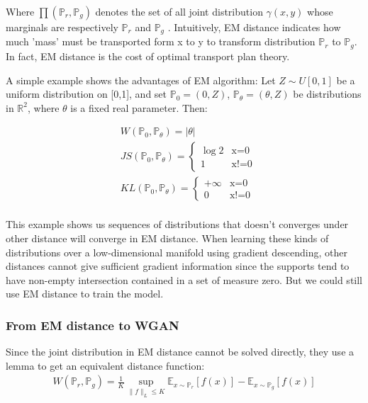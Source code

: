 Where $\prod(\mathbb{P}_r,\mathbb{P}_g)$ denotes the set of all joint distribution $\gamma(x,y)$ whose marginals are respectively $\mathbb{P}_r$ and $\mathbb{P}_g$ . Intuitively, EM distance indicates how much 'mass' must be transported form x to y to transform distribution $\mathbb{P}_r$ to $\mathbb{P}_g$. In fact, EM distance is the cost of optimal transport plan theory.

A simple example shows the advantages of EM algorithm: Let $Z \sim U[0,1]$ be a uniform distribution on [0,1], and set $\mathbb{P}_0 = (0,Z)$, $\mathbb{P}_\theta=(\theta,Z)$ be distributions in $\mathbb{R}^2$, where $\theta$ is a fixed real parameter. Then:

\begin{equation}
\begin{aligned}
&W(\mathbb{P}_0,\mathbb{P}_\theta) = |\theta|\\
&JS(\mathbb{P}_0,\mathbb{P}_\theta) = 
\begin{cases}
\log 2& \text{x=0}\\
1& \text{x!=0}
\end{cases}\\
&KL(\mathbb{P}_0,\mathbb{P}_\theta) = 
\begin{cases}
+\infty & \text{x=0}\\
0 & \text{x!=0}
\end{cases}\\
\end{aligned}
\end{equation}

This example shows us sequences of distributions that doesn't converges under other distance will converge in EM distance. When learning these kinds of distributions over a low-dimensional manifold using gradient descending, other distances cannot give sufficient gradient information since the supports tend to have non-empty intersection contained in a set of measure zero. But we could still use EM distance to train the model.

\subsubsection{From EM distance to WGAN}

Since the joint distribution in EM distance cannot be solved directly, they use a lemma to get an equivalent distance function:
\begin{equation}
\begin{aligned}
W(\mathbb{P}_r,\mathbb{P}_g) = \frac{1}{K} \sup \limits_{\|f\|_L\le K} \mathbb{E}_{x\sim\mathbb{P}_r}[f(x)]-\mathbb{E}_{x\sim\mathbb{P}_g}[f(x)]
\end{aligned}
\end{equation}


